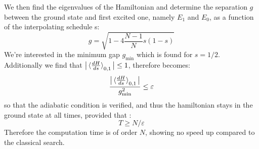     We then find the eigenvalues of the Hamiltonian and determine the separation $g$ between the ground state and first excited one, namely $E_1$ and $E_0$, as a function of the interpolating schedule s:
    \begin{equation}
      g=\sqrt{1-4\frac{N-1}{N}s(1-s)}
      \label{separation}
    \end{equation}
    We're interested in the minimum gap $g_{\min}$ which is found for $s=1/2$. Additionally we find that $\big|\braket{\frac{dH}{ds}}_{0,1}\big| \leq 1$, therefore  becomes:
    \begin{equation}
      \frac{\big|\braket{\frac{dH}{ds}}_{0,1}\big|}{g_{\min}^2} \leq \varepsilon
      \label{adiabatic_condition}
    \end{equation}
    so that the adiabatic condition is verified, and thus the hamiltonian stays in the ground state at all times, provided that :
    \begin{equation}
      T\geq N/\varepsilon
      \label{eq:adiabatic_scaling_global}
    \end{equation}
    Therefore the computation time is of order $N$, showing no speed up compared to the classical search.

